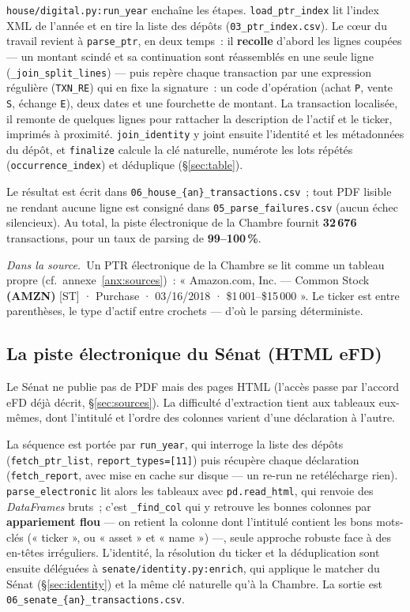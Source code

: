 \documentclass[11pt,a4paper]{article}
\newcommand{\co}[1]{\texttt{\small #1}}
\newcommand{\srcex}[1]{\par\smallskip\noindent{\color{black!55}\rule{2pt}{\baselineskip}}\hspace{6pt}\begin{minipage}{\dimexpr\linewidth-16pt}\small\textit{Dans la source.}\ #1\end{minipage}\par\smallskip}
\begin{document}
\co{house/digital.py:run_year} enchaîne les étapes. \co{load_ptr_index} lit l'index XML de l'année et en
tire la liste des dépôts (\co{03_ptr_index.csv}). Le cœur du travail revient à \co{parse_ptr}, en deux
temps~: il \textbf{recolle} d'abord les lignes coupées — un montant scindé et sa continuation sont
réassemblés en une seule ligne (\co{_join_split_lines}) — puis repère chaque transaction par une expression
régulière (\co{TXN_RE}) qui en fixe la signature~: un code d'opération (achat \co{P}, vente \co{S}, échange
\co{E}), deux dates et une fourchette de montant. La transaction localisée, il remonte de quelques lignes
pour rattacher la description de l'actif et le ticker, imprimés à proximité. \co{join_identity} y joint
ensuite l'identité et les métadonnées du dépôt, et
\co{finalize} calcule la clé naturelle, numérote les lots répétés (\co{occurrence_index}) et déduplique
(§\ref{sec:table}).

Le résultat est écrit dans \co{06_house_\{an\}_transactions.csv}~; tout PDF lisible ne rendant aucune ligne
est consigné dans \co{05_parse_failures.csv} (aucun échec silencieux). Au total, la piste électronique de la
Chambre fournit \textbf{32\,676} transactions, pour un taux de parsing de \textbf{99--100\,\%}.

\srcex{Un PTR électronique de la Chambre se lit comme un tableau propre (cf.~annexe~\ref{anx:sources})~:
« Amazon.com, Inc. — Common Stock \textbf{(AMZN)} [ST] · Purchase · 03/16/2018 · \$1\,001--\$15\,000 ».
Le ticker est entre parenthèses, le type d'actif entre crochets — d'où le parsing déterministe.}

\subsection{La piste électronique du Sénat (HTML eFD)}
\label{sec:sdig}
Le Sénat ne publie pas de PDF mais des pages HTML (l'accès passe par l'accord eFD déjà décrit,
§\ref{sec:sources}). La difficulté d'extraction tient aux tableaux eux-mêmes, dont l'intitulé et l'ordre des
colonnes varient d'une déclaration à l'autre.

La séquence est portée par \co{run_year}, qui interroge la liste des dépôts (\co{fetch_ptr_list},
\co{report_types=[11]}) puis récupère chaque déclaration (\co{fetch_report}, avec mise en cache sur disque —
un re-run ne retélécharge rien). \co{parse_electronic} lit alors les tableaux avec \co{pd.read_html}, qui
renvoie des \emph{DataFrames} bruts~; c'est \co{_find_col} qui y retrouve les bonnes colonnes par
\textbf{appariement flou} — on retient la colonne dont l'intitulé contient les bons mots-clés (« ticker »,
ou « asset » et « name ») —, seule approche robuste face à des en-têtes irréguliers. L'identité, la
résolution du ticker et la déduplication sont ensuite déléguées à \co{senate/identity.py:enrich}, qui
applique le matcher du Sénat (§\ref{sec:identity}) et la même clé naturelle qu'à la Chambre. La sortie est
\co{06_senate_\{an\}_transactions.csv}.
\end{document}

